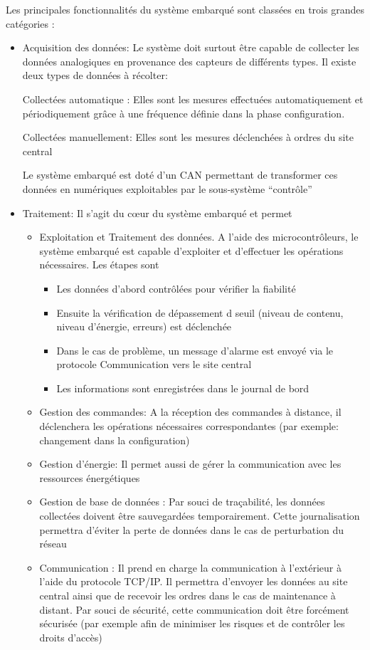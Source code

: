         Les principales fonctionnalités du système embarqué sont classées en trois grandes catégories :
        \begin{itemize}
            \item Acquisition des données: Le système doit surtout être capable de collecter les données analogiques en provenance des capteurs de différents types. Il existe deux types de données à récolter: 

				Collectées automatique : Elles sont les mesures effectuées automatiquement et périodiquement grâce à une fréquence définie dans la phase configuration.

				Collectées manuellement: Elles sont les mesures déclenchées à ordres du site central

				Le système embarqué est doté d’un CAN permettant de transformer ces données en numériques exploitables par le sous-système ``contrôle''
				
				\item Traitement: Il s’agit du cœur du système embarqué et permet \begin{itemize}
				\item Exploitation et Traitement des données. A l’aide des microcontrôleurs, le système embarqué est capable d’exploiter et d’effectuer les opérations nécessaires. Les étapes sont 
					\begin{itemize}
					    \item Les données d’abord contrôlées pour vérifier la fiabilité
						 \item Ensuite la vérification de dépassement d seuil (niveau de contenu, niveau d’énergie, erreurs) est déclenchée 
						 \item Dans le cas de problème, un message d’alarme est envoyé via le protocole Communication vers le site central
						 \item Les informations sont enregistrées dans le journal de bord
					\end{itemize}

            \item Gestion des commandes: A la réception des commandes à distance, il déclenchera les opérations nécessaires correspondantes (par exemple: changement dans la configuration)
				\item Gestion d’énergie: Il permet aussi de gérer la communication avec les ressources énergétiques
				\item Gestion de base de données : Par souci de traçabilité, les données collectées doivent être sauvegardées temporairement. Cette journalisation permettra d’éviter la perte de données dans le cas de perturbation du réseau
				\item Communication : Il prend en charge la communication à l’extérieur à l’aide du protocole TCP/IP. Il permettra d’envoyer les données au site central ainsi que de recevoir les ordres dans le cas de maintenance à distant. Par souci de sécurité, cette communication doit être forcément sécurisée (par exemple afin de minimiser les risques et de contrôler les droits d’accès)
        \end{itemize}
		\end{itemize}

